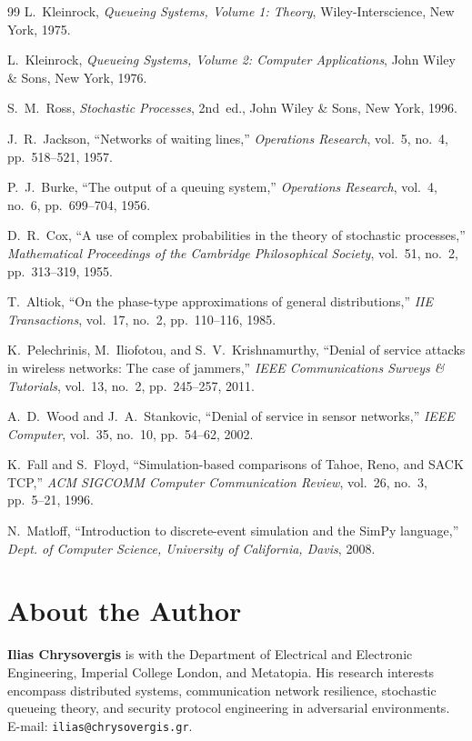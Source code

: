 \documentclass[12pt,onecolumn]{article}
\begin{document}
\begin{thebibliography}{99}
L.~Kleinrock, \textit{Queueing Systems, Volume 1: Theory}, Wiley-Interscience, New York, 1975.

L.~Kleinrock, \textit{Queueing Systems, Volume 2: Computer Applications}, John Wiley \& Sons, New York, 1976.

S.~M.~Ross, \textit{Stochastic Processes}, 2nd~ed., John Wiley \& Sons, New York, 1996.

J.~R.~Jackson, ``Networks of waiting lines,'' \textit{Operations Research}, vol.~5, no.~4, pp.~518--521, 1957.

P.~J.~Burke, ``The output of a queuing system,'' \textit{Operations Research}, vol.~4, no.~6, pp.~699--704, 1956.

D.~R.~Cox, ``A use of complex probabilities in the theory of stochastic processes,'' \textit{Mathematical Proceedings of the Cambridge Philosophical Society}, vol.~51, no.~2, pp.~313--319, 1955.

T.~Altiok, ``On the phase-type approximations of general distributions,'' \textit{IIE Transactions}, vol.~17, no.~2, pp.~110--116, 1985.

K.~Pelechrinis, M.~Iliofotou, and S.~V.~Krishnamurthy, ``Denial of service attacks in wireless networks: The case of jammers,'' \textit{IEEE Communications Surveys \& Tutorials}, vol.~13, no.~2, pp.~245--257, 2011.

A.~D.~Wood and J.~A.~Stankovic, ``Denial of service in sensor networks,'' \textit{IEEE Computer}, vol.~35, no.~10, pp.~54--62, 2002.

K.~Fall and S.~Floyd, ``Simulation-based comparisons of Tahoe, Reno, and SACK TCP,'' \textit{ACM SIGCOMM Computer Communication Review}, vol.~26, no.~3, pp.~5--21, 1996.

N.~Matloff, ``Introduction to discrete-event simulation and the SimPy language,'' \textit{Dept. of Computer Science, University of California, Davis}, 2008.
\end{thebibliography}

\section*{About the Author}
\noindent\textbf{Ilias Chrysovergis} is with the Department of Electrical and Electronic Engineering, Imperial College London, and Metatopia. His research interests encompass distributed systems, communication network resilience, stochastic queueing theory, and security protocol engineering in adversarial environments. E-mail: \texttt{ilias@chrysovergis.gr}.
\end{document}
